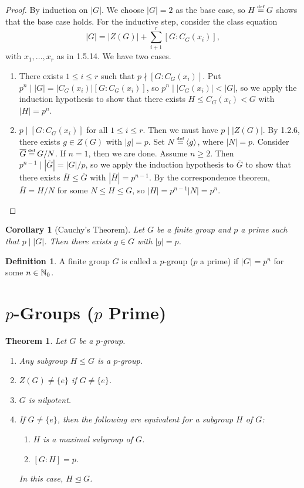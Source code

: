 \documentclass[11pt]{book}
\newcounter{counter}
\newtheorem{theorem}[counter]{Theorem}   \newtheorem*{theorem*}{Theorem}   \newtheorem{lemma}[counter]{Lemma}   \newtheorem{corollary}[counter]{Corollary}
\theoremstyle{definition}   \newtheorem{defn}[counter]{Definition} %
\newcommand{\ov}{\overline}   \newcommand{\wt}{\widetilde}
\newcommand{\nsg}{\mathrel{\unlhd}}   \newcommand{\ind}{\parindent24pt}   \newcommand{\vn}{\varnothing}
\newcommand\myeq{\mathrel{\overset{\makebox[0pt]{\mbox{\normalfont\tiny\sffamily \textrm{def}}}}{=}}}
\newcommand{\gen}[1]{\langle #1 \rangle}   \newcommand{\stab}[2]{\tn{Stab}_{#1}(#2)}   \newcommand{\fix}[2]{\tn{Fix}_{#1}(#2)}
\newcommand{\vs}{\vspace{8pt}}
\numberwithin{counter}{chapter}
\begin{document}
\begin{proof}
By induction on $|G|$. We choose $|G|=2$ as the base case, so $H \myeq G$ shows that the base case holds. For the inductive step, consider the class equation
	\[ |G| = |Z(G)| + \sum_{i+1}^r [G : C_G(x_i)], \]
with $x_1,\dots,x_r$ as in 1.5.14. We have two cases.
	\begin{enumerate}
	\item[First Case. ] There exists $1 \leq i \leq r$ such that $p \nmid [G : C_G(x_i)]$. Put $p^n \mid |G| = |C_G(x_i)| [G : C_G(x_i)]$, so $p^n \mid |C_G(x_i)| < |G|$, so we apply the induction hypothesis to show that there exists $H \leq C_G(x_i) < G$ with $|H| = p^n$.
	\item[Second Case. ] $p \mid [G : C_G(x_i)]$ for all $1 \leq i \leq r$. Then we must have $p \mid |Z(G)|$. By 1.2.6, there exists $g \in Z(G)$ with $|g| = p$. Set $N \myeq \gen{g}$, where $|N| = p$. Consider $\ov{G} \myeq G/N$. If $n=1$, then we are done. Assume $n \geq 2$. Then $p^{n-1} \mid |\ov{G}| = |G|/p$, so we apply the induction hypothesis to $\ov{G}$ to show that there exists $\ov{H} \leq \ov{G}$ with $|\ov{H}| = p^{n-1}$. By the correspondence theorem, $\ov{H} = H/N$ for some $N \leq H \leq G$, so $|H| = p^{n-1} |N| = p^n$.
	\end{enumerate}
\end{proof}

\vs

\begin{corollary}[Cauchy's Theorem]
Let $G$ be a finite group and $p$ a prime such that $p \mid |G|$. Then there exists $g \in G$ with $|g| = p$.
\end{corollary}

\vs

\begin{defn}
A finite group $G$ is called a $p$-group ($p$ a prime) if $|G|=p^n$ for some $n \in \operatorname{\mathbb{N}}_0$.
\end{defn}

\vs

\section*{$p$-Groups ($p$ Prime)}

\vs

\begin{theorem}
Let $G$ be a $p$-group.
\begin{enumerate}
\item[(a)] Any subgroup $H \leq G$ is a $p$-group.
\item[(b)] $Z(G) \ne \{e\}$ if $G \ne \{e\}$.
\item[(c)] $G$ is nilpotent.
\item[(d)] If $G \ne \{e\}$, then the following are equivalent for a subgroup $H$ of $G$:
	\begin{enumerate}
	\item[(i)] $H$ is a maximal subgroup of $G$.
	\item[(ii)] $[G : H] = p$.
	\end{enumerate}
In this case, $H\nsg G$.
\end{enumerate}
\end{theorem}
\end{document}
